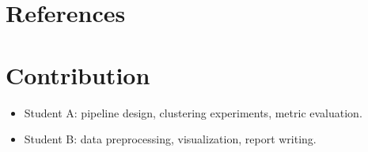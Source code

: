 \documentclass{article}
\begin{document}
\section*{References}



\section*{Contribution}
\begin{itemize}
\item Student A: pipeline design, clustering experiments, metric evaluation.
\item Student B: data preprocessing, visualization, report writing.
\end{itemize}
\end{document}
